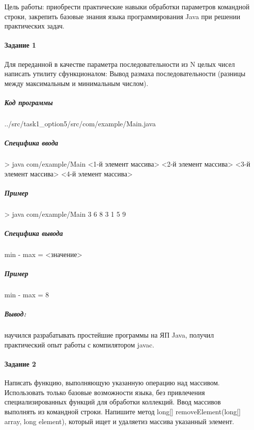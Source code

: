 Цель работы:
приобрести практические навыки обработки параметров командной строки,
закрепить базовые знания языка программирования Java при решении практических задач.


\paragraph{Задание 1} \hspace{0pt}

Для переданной в качестве параметра последовательности из N целых чисел написать утилиту сфункционалом:
Вывод размаха последовательности (разницы между максимальным и минимальным числом).


\subparagraph{Код программы} \hspace{0pt}


{../src/task1_option5/src/com/example/Main.java}

\subparagraph{Специфика ввода} \hspace{0pt}

> java com/example/Main <1-й элемент массива> <2-й элемент массива> <3-й элемент массива> <4-й элемент массива>

\subparagraph{Пример} \hspace{0pt}

> java com/example/Main 3 6 8 3 1 5 9

\subparagraph{Специфика вывода} \hspace{0pt}

min - max = <значение>

\subparagraph{Пример} \hspace{0pt}

min - max = 8

\subparagraph{Вывод:}
научился разрабатывать простейшие программы на ЯП Java,
получил практический опыт работы с компилятором javac.



\paragraph{Задание 2} \hspace{0pt}

Написать функцию, выполняющую указанную операцию над массивом.
Использовать только базовые возможности языка, без привлечения специализированных функций для обработки коллекций.
Ввод массивов выполнять из командной строки.
Напишите метод long[] removeElement(long[] array, long element), который ищет и удаляетиз массива указанный элемент.

